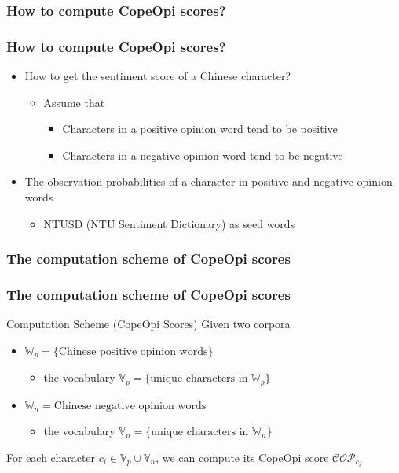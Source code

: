 \documentclass[mathserif]{beamer}
\begin{document}
\subsubsection{How to compute CopeOpi scores?}
\begin{frame}
\frametitle{How to compute CopeOpi scores?}
\begin{itemize}
\item How to get the sentiment score of a Chinese character?
	\begin{itemize}
	\item Assume that
		\begin{itemize}
		\item Characters in a positive opinion word tend to be positive
		\item Characters in a negative opinion word tend to be negative
		\end{itemize}
	\end{itemize}
\item The observation probabilities of a character in positive and negative opinion words
	\begin{itemize}
	\item NTUSD (NTU Sentiment Dictionary) as seed words
	\end{itemize}
\end{itemize}
\end{frame}
\subsubsection{The computation scheme of CopeOpi scores}
\begin{frame}
\frametitle{The computation scheme of CopeOpi scores}
\begin{block}{Computation Scheme (CopeOpi Scores)}
Given two corpora
\begin{itemize}
\item $\mathbb{W}_p=\{\text{Chinese positive opinion words}\}$
	\begin{itemize}
	\item the vocabulary $\mathbb{V}_p=\{\text{unique characters in }\mathbb{W}_p\}$
	\end{itemize}
\item $\mathbb{W}_n={\text{Chinese negative opinion words}}$
	\begin{itemize}
	\item the vocabulary $\mathbb{V}_n=\{\text{unique characters in }\mathbb{W}_n\}$
	\end{itemize}
\end{itemize}
For each character $c_i \in \mathbb{V}_p \cup \mathbb{V}_n$, we can compute its CopeOpi score $\mathcal{COP}_{c_i}$
\end{block}
\end{frame}
\end{document}
